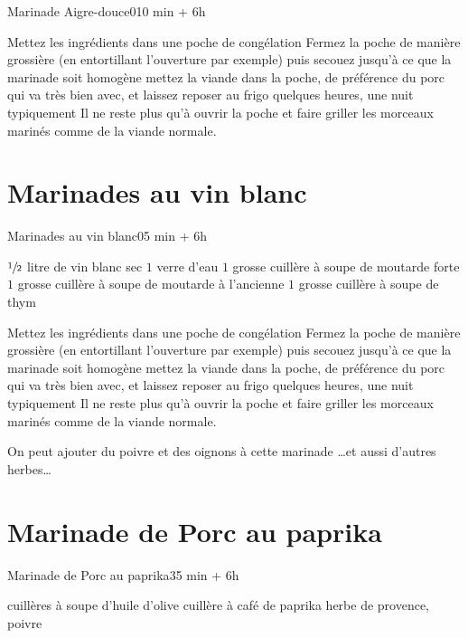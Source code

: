 {\begin{recette}{Marinade Aigre-douce}{0}{10 min + 6h}{}
\begin{preparation}
\etape Mettez les ingrédients dans une poche de congélation
\etape Fermez la poche de manière grossière (en entortillant l'ouverture par exemple) puis secouez jusqu'à ce que la marinade 
soit homogène
\etape mettez la viande dans la poche, de préférence du porc qui va très bien avec, et laissez reposer au frigo quelques heures, 
une nuit typiquement
\etape Il ne reste plus qu'à ouvrir la poche et faire griller les morceaux marinés comme de la viande normale.
\end{preparation}
\end{recette}

\section{Marinades au vin blanc}
\begin{recette}{Marinades au vin blanc}{0}{5 min + 6h}{}
\begin{ingredients}
\ingredient $\sfrac{1}{2}$ litre de vin blanc sec
\ingredient $1$ verre d'eau
\ingredient $1$ grosse cuillère à soupe de moutarde forte
\ingredient $1$ grosse cuillère à soupe de moutarde à l'ancienne
\ingredient $1$ grosse cuillère à soupe de thym
\end{ingredients}

\begin{preparation}
\etape Mettez les ingrédients dans une poche de congélation
\etape Fermez la poche de manière grossière (en entortillant l'ouverture par exemple) puis secouez jusqu'à ce que la marinade 
soit homogène
\etape mettez la viande dans la poche, de préférence du porc qui va très bien avec, et laissez reposer au frigo quelques heures, 
une nuit typiquement
\etape Il ne reste plus qu'à ouvrir la poche et faire griller les morceaux marinés comme de la viande normale.
\end{preparation}

\begin{remarque}
On peut ajouter du poivre et des oignons à cette marinade \dots  et aussi d'autres herbes\dots
\end{remarque}
\end{recette}

\section{Marinade de Porc au paprika}
\begin{recette}{Marinade de Porc au paprika}{3}{5 min + 6h}{}
\begin{ingredients}
 cuillères à soupe d'huile d'olive
 cuillère à café de paprika
\ingredient herbe de provence, poivre
\end{ingredients}


\end{recette}}
